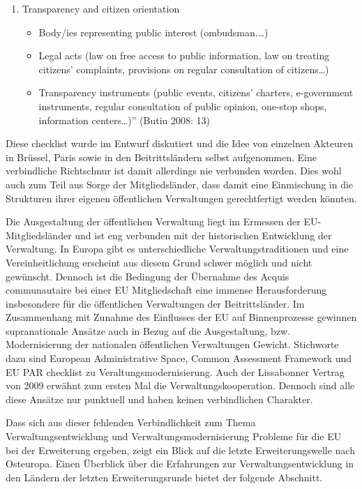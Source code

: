 \begin{enumerate}
\begin{itemize}
\end{itemize}
\item Transparency and citizen orientation 
\begin{itemize}
\item Body/ies representing public interest (ombudsman.…)
\item Legal acts (law on free access to public information, law on treating citizens’ complaints, provisions on regular consultation of citizens…) 
\item Transparency instruments (public events, citizens’ charters, e-government instruments, regular consultation of public opinion, one-stop shops, information centers…)”
(Butiu 2008: 13)
\end{itemize}
\end{enumerate}

Diese checklist wurde im Entwurf diskutiert und die Idee von einzelnen Akteuren in Brüssel, Paris sowie in den Beitrittsländern selbst aufgenommen. Eine verbindliche Richtschnur ist damit allerdings nie verbunden worden. Dies wohl auch zum Teil aus Sorge der Mitgliedsländer, dass damit eine Einmischung in die Strukturen ihrer eigenen öffentlichen Verwaltungen gerechtfertigt werden könnten. \par
Die Ausgestaltung der öffentlichen Verwaltung liegt im Ermessen der EU-Mitgliedsländer und ist eng verbunden mit der historischen Entwicklung der Verwaltung. In Europa gibt es unterschiedliche Verwaltungstraditionen und eine Vereinheitlichung erscheint aus diesem Grund schwer möglich und nicht gewünscht. Dennoch ist die Bedingung der Übernahme des Acquis communautaire bei einer EU Mitgliedschaft eine immense Herausforderung insbesondere für die öffentlichen Verwaltungen der Beitrittsländer. Im Zusammenhang mit Zunahme des Einflusses der EU auf Binnenprozesse gewinnen supranationale Ansätze auch in Bezug auf die Ausgestaltung, bzw. Modernisierung der nationalen öffentlichen Verwaltungen Gewicht. Stichworte dazu sind European Administrative Space, Common Assessment Framework und EU PAR checklist zu Veraltungsmodernisierung. Auch der Lissabonner Vertrag von 2009 erwähnt zum ersten Mal die Verwaltungskooperation. Dennoch sind alle diese Ansätze nur punktuell und haben keinen verbindlichen Charakter.\par
Dass sich aus dieser fehlenden Verbindlichkeit zum Thema Verwaltungsentwicklung und Verwaltungsmodernisierung Probleme für die EU bei der Erweiterung ergeben, zeigt ein Blick auf die letzte Erweiterungswelle nach Osteuropa. Einen Überblick über die Erfahrungen zur Verwaltungsentwicklung in den Ländern der letzten Erweiterungsrunde bietet der folgende Abschnitt.

